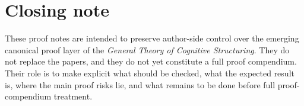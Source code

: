 \documentclass[12pt]{article}
\begin{document}
	\section{Closing note}
	
	These proof notes are intended to preserve author-side control over the emerging canonical proof
	layer of the \emph{General Theory of Cognitive Structuring}. They do not replace the papers, and
	they do not yet constitute a full proof compendium. Their role is to make explicit what should
	be checked, what the expected result is, where the main proof risks lie, and what remains to be
	done before full proof-compendium treatment.
	
\end{document}
